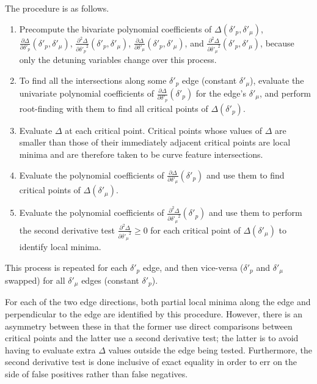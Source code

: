 The procedure is as follows.
\begin{enumerate}
    \item Precompute the bivariate polynomial coefficients of $\Delta(\delta'_p, \delta'_\mu)$, $\frac{\partial\Delta}{\partial\delta'_p}(\delta'_p, \delta'_\mu)$, $\frac{\partial^2\Delta}{{\partial\delta'_p}^2}(\delta'_p, \delta'_\mu)$, $\frac{\partial\Delta}{\partial\delta'_\mu}(\delta'_p, \delta'_\mu)$, and $\frac{\partial^2\Delta}{{\partial\delta'_\mu}^2}(\delta'_p, \delta'_\mu)$, because only the detuning variables change over this process.
    \item To find all the intersections along some $\delta'_p$ edge (constant $\delta'_\mu$), evaluate the univariate polynomial coefficients of $\frac{\partial\Delta}{\partial\delta'_p}(\delta'_p)$ for the edge's $\delta'_\mu$, and perform root-finding with them to find all critical points of $\Delta(\delta'_p)$.
    \item Evaluate $\Delta$ at each critical point. Critical points whose values of $\Delta$ are smaller than those of their immediately adjacent critical points are local minima and are therefore taken to be curve feature intersections.
    \item Evaluate the polynomial coefficients of $\frac{\partial\Delta}{\partial\delta'_\mu}(\delta'_p)$ and use them to find critical points of $\Delta(\delta'_\mu)$.
    \item Evaluate the polynomial coefficients of $\frac{\partial^2\Delta}{{\partial\delta'_\mu}^2}(\delta'_p)$ and use them to perform the second derivative test $\frac{\partial^2\Delta}{{\partial\delta'_\mu}^2} \geq 0$ for each critical point of $\Delta(\delta'_\mu)$ to identify local minima.
\end{enumerate}
This process is repeated for each $\delta'_p$ edge, and then vice-versa ($\delta'_p$ and $\delta'_\mu$ swapped) for all $\delta'_\mu$ edges (constant $\delta'_p$).

For each of the two edge directions, both partial local minima along the edge and perpendicular to the edge are identified by this procedure. However, there is an asymmetry between these in that the former use direct comparisons between critical points and the latter use a second derivative test; the latter is to avoid having to evaluate extra $\Delta$ values outside the edge being tested. Furthermore, the second derivative test is done inclusive of exact equality in order to err on the side of false positives rather than false negatives.


